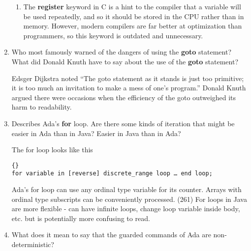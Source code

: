 \begin{enumerate}
\begin{answer}
\begin{enumerate}
        \item The \textbf{register} keyword in C is a hint to the compiler
        that a variable will be used repeatedly, and so it should be
        stored in the CPU rather than in memory. However, modern
        compilers are far better at optimization than programmers, so
        this keyword is outdated and unnecessary.
        
     \end{enumerate}

\end{answer}

  \item Who most famously warned of the dangers of using the
    \textbf{goto} statement? What did Donald Knuth have to
    say about the use of the \textbf{goto} statement?
    
\begin{answer}

    Edsger Dijkstra noted “The goto statement as it stands is just too
    primitive; it is too much an invitation to make a mess of one’s
    program.” Donald Knuth argued there were occasions when the
    efficiency of the goto outweighed its harm to readability.
    
\end{answer}


  \item Describes Ada's \textbf{for} loop. Are there some
    kinds of iteration that might be easier in Ada than
    in Java? Easier in Java than in Ada?

\begin{answer}

    The for loop looks like this

\begin{lstlisting}{}
for variable in [reverse] discrete_range loop … end loop; 
\end{lstlisting}

Ada’s for loop can use any ordinal type variable for its
counter. Arrays with ordinal type subscripts can be conveniently
processed. (261) For loops in Java are more flexible - can have
infinite loops, change loop variable inside body, etc. but is
potentially more confusing to read.

\end{answer}


  \item What does it mean to say that the guarded commands
    of Ada are non-deterministic?
    
\begin{answer}


\end{answer}
\end{enumerate}
